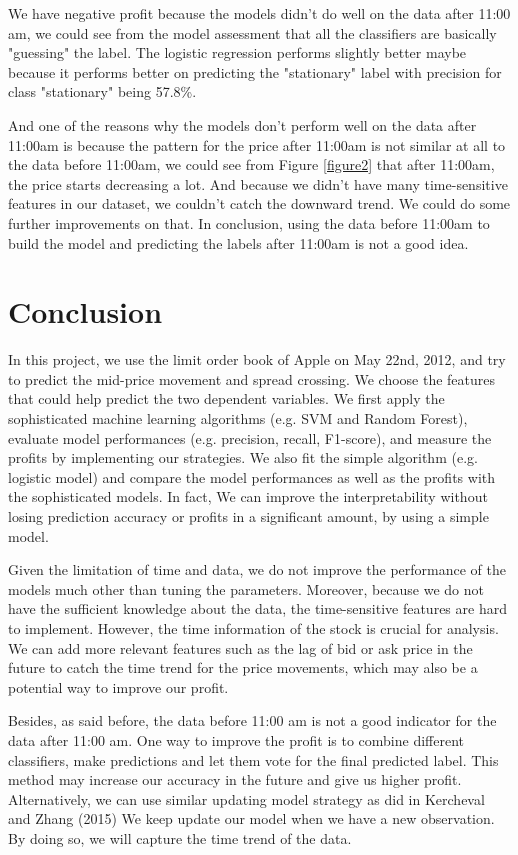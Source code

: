 \documentclass[11pt]{article}
\begin{document}
We have negative profit because the models didn't do well on the data after 11:00 am, we could see from the model assessment that all the classifiers are basically "guessing" the label. The logistic regression performs slightly better maybe because it performs better on predicting the "stationary" label with precision for class "stationary" being 57.8\%.

And one of the reasons why the models don't perform well on the data after 11:00am is because the pattern for the price after 11:00am is not similar at all to the data before 11:00am, we could see from Figure \ref{figure2} that after 11:00am, the price starts decreasing a lot. And because we didn't have many time-sensitive features in our dataset, we couldn't catch the downward trend. We could do some further improvements on that. In conclusion, using the data before 11:00am to build the model and predicting the labels after 11:00am is not a good idea.
 
\section{Conclusion} \label{conclusion}

In this project, we use the limit order book of Apple on May 22nd, 2012, and try to predict the mid-price movement and spread crossing. We choose the features that could help predict the two dependent variables. We first apply the sophisticated machine learning algorithms (e.g. SVM and Random Forest), evaluate model performances (e.g. precision, recall, F1-score), and measure the profits by implementing our strategies. We also fit the simple algorithm (e.g. logistic model) and compare the model performances as well as the profits with the sophisticated models. In fact, We can improve the interpretability without losing prediction accuracy or profits in a significant amount, by using a simple model.

Given the limitation of time and data, we do not improve the performance of the models much other than tuning the parameters. Moreover, because we do not have the sufficient knowledge about the data, the time-sensitive features are hard to implement. However, the time information of the stock is crucial for analysis. We can add more relevant features such as the lag of bid or ask price in the future to catch the time trend for the price movements, which may also be a potential way to improve our profit.

Besides, as said before, the data before 11:00 am is not a good indicator for the data after 11:00 am. One way to improve the profit is to combine different classifiers, make predictions and let them vote for the final predicted label. This method may increase our accuracy in the future and give us higher profit. Alternatively, we can use similar updating model strategy as did in Kercheval and Zhang (2015) \cite{2015finance} We keep update our model when we have a new observation. By doing so, we will capture the time trend of the data.

\newpage

{}

\end{document}
